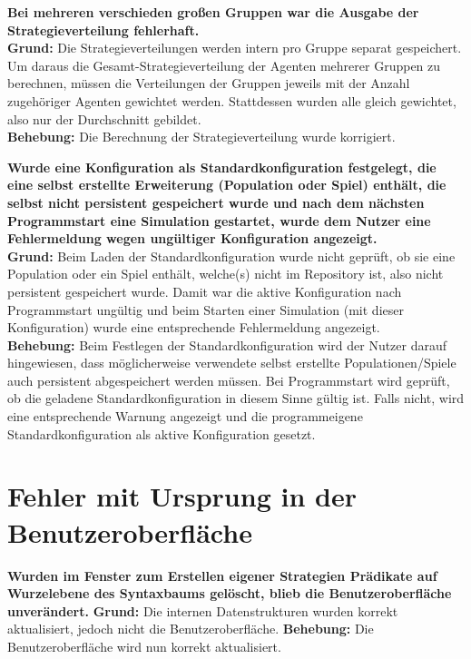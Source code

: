 \documentclass[parskip=full,11pt,openany]{scrreprt}
\begin{document}
\textbf{Bei mehreren verschieden großen Gruppen war die Ausgabe der Strategieverteilung fehlerhaft.}\\
\textbf{Grund: } Die Strategieverteilungen werden intern pro Gruppe separat gespeichert. Um daraus die Gesamt-Strategieverteilung der Agenten mehrerer Gruppen zu berechnen, müssen die Verteilungen der Gruppen jeweils mit der Anzahl zugehöriger Agenten gewichtet werden. Stattdessen wurden alle gleich gewichtet, also nur der Durchschnitt gebildet.\\
\textbf{Behebung: } Die Berechnung der Strategieverteilung wurde korrigiert.

\textbf{Wurde eine Konfiguration als Standardkonfiguration festgelegt, die eine selbst erstellte Erweiterung (Population oder Spiel) enthält, die selbst nicht persistent gespeichert wurde und nach dem nächsten Programmstart eine Simulation gestartet, wurde dem Nutzer eine Fehlermeldung wegen ungültiger Konfiguration angezeigt.}\\
\textbf{Grund: } Beim Laden der Standardkonfiguration wurde nicht geprüft, ob sie eine Population oder ein Spiel enthält, welche(s) nicht im Repository ist, also nicht persistent gespeichert wurde. Damit war die aktive Konfiguration nach Programmstart ungültig und beim Starten einer Simulation (mit dieser Konfiguration) wurde eine entsprechende Fehlermeldung angezeigt.\\
\textbf{Behebung: } Beim Festlegen der Standardkonfiguration wird der Nutzer darauf hingewiesen, dass möglicherweise verwendete selbst erstellte Populationen/Spiele auch persistent abgespeichert werden müssen. Bei Programmstart wird geprüft, ob die geladene Standardkonfiguration in diesem Sinne gültig ist. Falls nicht, wird eine entsprechende Warnung angezeigt und die programmeigene Standardkonfiguration als aktive Konfiguration gesetzt.

\section{Fehler mit Ursprung in der Benutzeroberfläche}

\textbf{Wurden im Fenster zum Erstellen eigener Strategien Prädikate auf Wurzelebene des Syntaxbaums gelöscht, blieb die Benutzeroberfläche unverändert.} 
\newline
\textbf{Grund: } Die internen Datenstrukturen wurden  korrekt aktualisiert, jedoch nicht die Benutzeroberfläche.
\newline
\textbf{Behebung: } Die Benutzeroberfläche wird nun korrekt aktualisiert.
\end{document}
